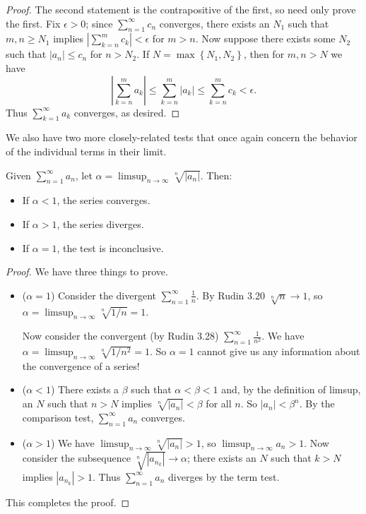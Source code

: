 \documentclass[../m131main.tex]{subfiles}
\begin{document}
\begin{proof}
    The second statement is the contrapositive of the first, so need only prove the first.
    Fix $\epsilon > 0$; since $\sum_{n=1}^{\infty} c_n$ converges, there exists an $N_1$ such that $m,n \geq N_1$ implies $|\sum_{k=n}^{m} c_k| < \epsilon$ for $m > n$.
    Now suppose there exists some $N_2$ such that $|a_n| \leq c_n$ for $n > N_2$.
    If $N = \max \left\{ N_1, N_2 \right\}$, then for $m,n > N$ we have
    \[ \left| \sum_{k=n}^{m} a_k \right| \leq \sum_{k=n}^{m} |a_k| \leq \sum_{k=n}^{m} c_k < \epsilon. \]
    Thus $\sum_{k=1}^{\infty} a_k$ converges, as desired.
\end{proof}

We also have two more closely-related tests that once again concern the behavior of the individual terms in their limit.

\begin{theorem}
    Given $\sum_{n=1}^{\infty} a_n$, let $\alpha = \limsup_{n \to \infty} \sqrt[n]{|a_n|}$.
    Then:
    \begin{itemize}
        \item If $\alpha < 1$, the series converges.
        \item If $\alpha > 1$, the series diverges.
        \item If $\alpha = 1$, the test is inconclusive.
    \end{itemize}
\end{theorem}

\begin{proof}
    We have three things to prove.
    \begin{itemize}
        \item ($\alpha = 1$)
        Consider the divergent $\sum_{n=1}^{\infty} \frac{1}{n}$.
        By Rudin 3.20 $\sqrt[n]{n} \to 1$, so $\alpha = \limsup_{n \to \infty} \sqrt[n]{1 / n} = 1$.

        Now consider the convergent (by Rudin 3.28) $\sum_{n=1}^{\infty} \frac{1}{n^2}$.
        We have $\alpha = \limsup_{n \to \infty} \sqrt[n]{1 / n^2} = 1$.
        So $\alpha = 1$ cannot give us any information about the convergence of a series!

        \item ($\alpha < 1$)
        There exists a $\beta$ such that $\alpha < \beta < 1$ and, by the definition of limsup, an $N$ such that $n > N$ implies $\sqrt[n]{|a_n|} < \beta$ for all $n$.
        So $|a_n| < \beta^{n}$.
        By the comparison test, $\sum_{n=1}^{\infty} a_n$ converges.
        
        \item ($\alpha > 1$)
        We have $\limsup_{n \to \infty} \sqrt[n]{|a_n|} > 1$, so $\limsup_{n \to \infty} a_n > 1$.
        Now consider the subsequence $\sqrt[n]{|a_{n_k}|} \to \alpha$; there exists an $N$ such that $k > N$ implies $|a_{n_k}| > 1$.
        Thus $\sum_{n=1}^{\infty} a_n$ diverges by the term test.
    \end{itemize}
    This completes the proof.
\end{proof}
\end{document}
